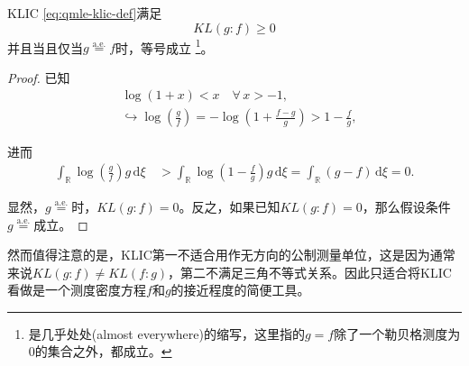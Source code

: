 \begin{theorem}[KLIC非负]
    \label{theorem:qmle-klic-nonnegative}
    KLIC \eqref{eq:qmle-klic-def}满足
    \begin{equation}
        \label{eq:qmle-klic-nonnegative}
        KL \left( g:f \right) \ge 0
    \end{equation}
    并且当且仅当$g \overset{\text{a.e.}}{=} f$时，等号成立
    \footnote{
    是几乎处处(almost everywhere)的缩写，这里指的$g=f$除了一个勒贝格测度为$0$的集合之外，都成立。
    }。
\end{theorem}
\begin{proof}
    已知
    \begin{equation*}
    \begin{split}
    & \log \left( 1 + x \right) < x \quad \forall \, x > -1, \\
    & \hookrightarrow \log \left( \frac{g}{f} \right) = - \log \left( 1 + \frac{f-g}{g} \right) > 1 - \frac{f}{g}, %
    \end{split}
    \end{equation*}

    进而
    \begin{equation*}
        \begin{split}
            \int_{\mathbb{R}} \log \left( \frac{g}{f} \right) g \, \mathrm{d} \xi \,
            & > \int_{\mathbb{R}} \log \left( 1 - \frac{f}{g} \right) g \, \mathrm{d} \xi = \int_{\mathbb{R}} \left( g - f \right) \, \mathrm{d} \xi = 0.
        \end{split}
    \end{equation*}

    显然，$g \overset{\text{a.e.}}{=}$时，$KL \left(g:f \right)=0$。反之，如果已知$KL \left(g:f \right)=0$，那么假设条件$g \overset{\text{a.e.}}{=}$成立。
\end{proof}

然而值得注意的是，KLIC第一不适合用作无方向的公制测量单位，这是因为通常来说$KL(g:f) \neq KL(f:g)$，第二不满足三角不等式关系。因此只适合将KLIC看做是一个测度密度方程$f$和$g$的接近程度的简便工具。

